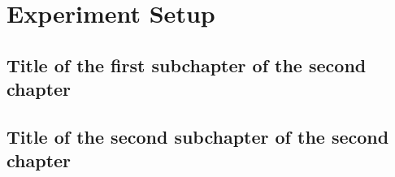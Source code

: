 \chapter{Experiment Setup}

\section{Title of the first subchapter of the second chapter}

\section{Title of the second subchapter of the second chapter}
